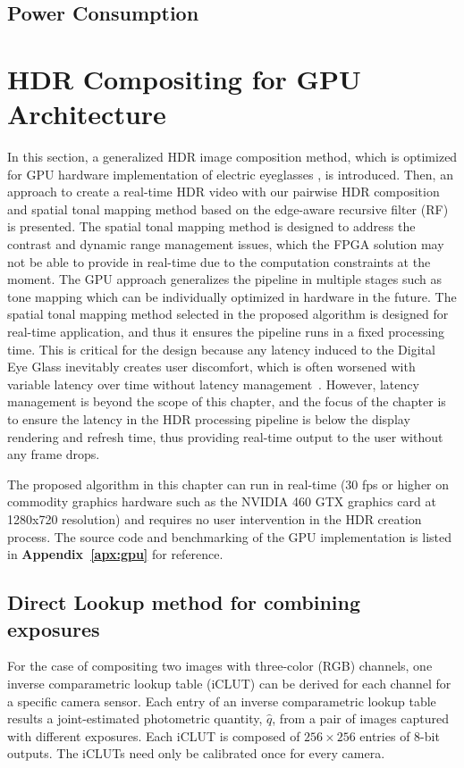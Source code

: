 \subsection{Power Consumption}



\section{HDR Compositing for GPU Architecture}

In this section, a generalized HDR image composition method, which is optimized for GPU hardware 
implementation of electric eyeglasses \cite{mannist,robertson2003estimation,ali2012ICASSP}, is 
introduced. Then, an approach to create a real-time HDR video with our pairwise HDR composition 
and spatial tonal mapping method based on the edge-aware recursive filter 
(RF)~\cite{GastalOliveira2011DomainTransform} is presented. The spatial tonal mapping method is 
designed to address the contrast and dynamic range management issues, which the FPGA solution 
may not be able to provide in real-time due to the computation constraints at the moment. The GPU 
approach generalizes the pipeline in multiple stages such as tone mapping which can be individually 
optimized in hardware in the future. The spatial tonal mapping method selected in the proposed 
algorithm is designed for real-time application, and thus it ensures the pipeline runs in a fixed 
processing time. This is critical for the design because any latency induced to the Digital Eye Glass 
inevitably creates user discomfort, which is often worsened with variable latency over time without 
latency management~\cite{jacobs1997managing}. However, latency management is beyond the 
scope of this chapter, and the focus of the chapter is to ensure the latency in the HDR processing 
pipeline is below the display rendering and refresh time, thus providing real-time output to the user 
without any frame drops.

The proposed algorithm in this chapter can run in real-time (30 fps or higher on commodity graphics 
hardware such as the NVIDIA 460 GTX graphics card at 1280x720 resolution) and requires no user 
intervention in the HDR creation process.  The source code and benchmarking of the GPU implementation is listed in \textbf{Appendix~\ref{apx:gpu}} for reference.  

\subsection{Direct Lookup method for combining exposures} \label{comp_2_lut_2}
For the case of compositing two images with three-color (RGB) channels, one inverse comparametric 
lookup table (iCLUT) can be derived for each channel for a specific camera sensor. Each entry of an 
inverse comparametric lookup table results a joint-estimated photometric quantity, $\hat{q}$, from a 
pair of images captured with different exposures. Each iCLUT is composed of $256\times256$ 
entries of 8-bit outputs. The iCLUTs need only be calibrated once for every camera.

